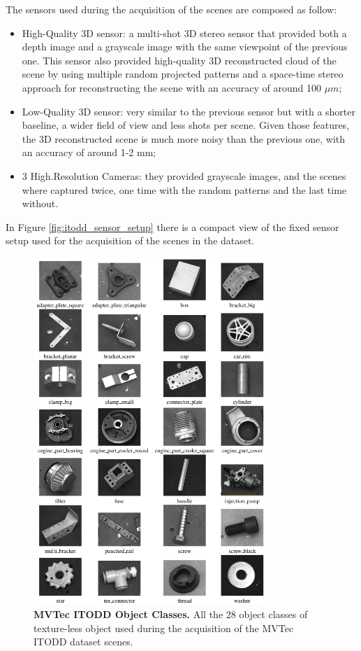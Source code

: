 The sensors used during the acquisition of the scenes are composed as follow:

\begin{itemize}
	\item High-Quality 3D sensor: a multi-shot 3D stereo sensor that provided both a depth image and a grayscale image with the same viewpoint of the previous one. This sensor also provided high-quality 3D reconstructed cloud of the scene by using multiple random projected patterns and a space-time stereo approach for reconstructing the scene with an accuracy of around 100 $\mu m$;
	\item Low-Quality 3D sensor: very similar to the previous sensor but with a shorter baseline, a wider field of view and less shots per scene. Given those features, the 3D reconstructed scene is much more noisy than the previous one, with an accuracy of around 1-2 mm;
	\item 3 High.Resolution Cameras: they provided grayscale images, and the scenes where captured twice, one time with the random patterns and the last time without. 
\end{itemize}

In Figure \ref{fig:itodd_sensor_setup} there is a compact view of the fixed sensor setup used for the acquisition of the scenes in the dataset.

\begin{figure}
    \centering
    \includegraphics[width=0.8\textwidth]{figures/2_benchmarks_and_metrics/itodd_object_examples}
    \caption{\textbf{MVTec ITODD Object Classes.} All the 28 object classes of texture-less object used during the acquisition of the MVTec ITODD dataset scenes.}
    \label{fig:itodd_object_examples}
\end{figure}

